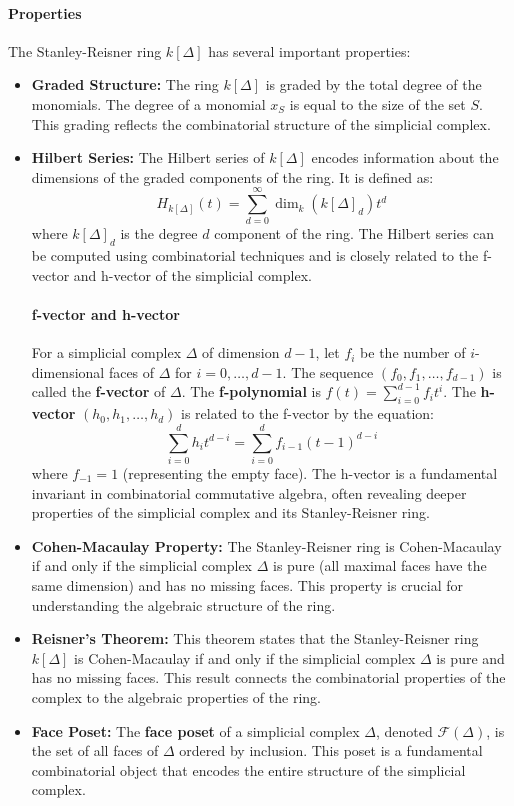 \documentclass[12pt]{article}
\theoremstyle{definition}
\numberwithin{equation}{subsection}
\begin{document}
\paragraph{Properties}
The Stanley-Reisner ring $k[\Delta]$ has several important properties:
\begin{itemize}
\item \textbf{Graded Structure:} The ring $k[\Delta]$ is graded by the total degree of the monomials. The degree of a monomial $x_S$ is equal to the size of the set $S$. This grading reflects the combinatorial structure of the simplicial complex.
\item \textbf{Hilbert Series:} The Hilbert series of $k[\Delta]$ encodes information about the dimensions of the graded components of the ring. It is defined as:
\[
H_{k[\Delta]}(t) = \sum_{d=0}^{\infty} \dim_k (k[\Delta]_d) t^d
\]
where $k[\Delta]_d$ is the degree $d$ component of the ring. The Hilbert series can be computed using combinatorial techniques and is closely related to the f-vector and h-vector of the simplicial complex.

\paragraph{f-vector and h-vector}
For a simplicial complex $\Delta$ of dimension $d-1$, let $f_i$ be the number of $i$-dimensional faces of $\Delta$ for $i=0, \ldots, d-1$. The sequence $(f_0, f_1, \ldots, f_{d-1})$ is called the \textbf{f-vector} of $\Delta$. The \textbf{f-polynomial} is $f(t) = \sum_{i=0}^{d-1} f_i t^i$.
The \textbf{h-vector} $(h_0, h_1, \ldots, h_d)$ is related to the f-vector by the equation:
\[
\sum_{i=0}^d h_i t^{d-i} = \sum_{i=0}^d f_{i-1} (t-1)^{d-i}
\]
where $f_{-1}=1$ (representing the empty face). The h-vector is a fundamental invariant in combinatorial commutative algebra, often revealing deeper properties of the simplicial complex and its Stanley-Reisner ring.

\item \textbf{Cohen-Macaulay Property:} The Stanley-Reisner ring is Cohen-Macaulay if and only if the simplicial complex $\Delta$ is pure (all maximal faces have the same dimension) and has no missing faces. This property is crucial for understanding the algebraic structure of the ring.
\item \textbf{Reisner's Theorem:} This theorem states that the Stanley-Reisner ring $k[\Delta]$ is Cohen-Macaulay if and only if the simplicial complex $\Delta$ is pure and has no missing faces. This result connects the combinatorial properties of the complex to the algebraic properties of the ring.
\item \textbf{Face Poset:} The \textbf{face poset} of a simplicial complex $\Delta$, denoted $\mathcal{F}(\Delta)$, is the set of all faces of $\Delta$ ordered by inclusion. This poset is a fundamental combinatorial object that encodes the entire structure of the simplicial complex.


\end{itemize}
\end{document}
